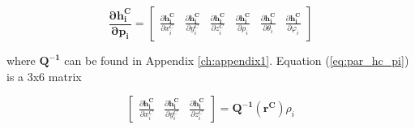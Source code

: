 

\begin{equation}
\label{eq:par_hc_pi}
\boldsymbol{\frac{\partial h_i^{C}}{\partial p_{i}}}=\begin{bmatrix}
\frac{\partial \boldsymbol{h_i^{C}}}{\partial x_{i}^{C}} & 
\frac{\partial \boldsymbol{h_i^{C}}}{\partial y_{i}^{C}} & 
\frac{\partial \boldsymbol{h_i^{C}}}{\partial z_{i}^{C}} & 
\frac{\partial \boldsymbol{h_i^{C}}}{\partial \rho _{i}} &
\frac{\partial \boldsymbol{h_i^{C}}}{\partial \theta _{i}} &
\frac{\partial \boldsymbol{h_i^{C}}}{\partial \varphi _{i}}
\end{bmatrix}
\end{equation}

\noindent where $\boldsymbol{Q^{-1}}$ can be found in
Appendix \ref{ch:appendix1}. Equation (\ref{eq:par_hc_pi}) is a 3x6 matrix

\begin{equation}
\begin{bmatrix}
\frac{\partial \boldsymbol{h_i^{C}}}{\partial x_{i}^{C}} & 
\frac{\partial \boldsymbol{h_i^{C}}}{\partial y_{i}^{C}} & 
\frac{\partial \boldsymbol{h_i^{C}}}{\partial z_{i}^{C}}
\end{bmatrix}
 =\boldsymbol{Q^{-1}(r^{C})}\rho _{i}
\end{equation}


